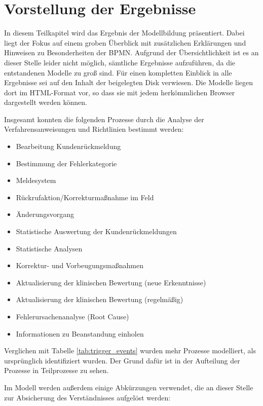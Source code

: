 \documentclass[a4paper,12pt]{report}
\begin{document}
\section{Vorstellung der Ergebnisse}\label{sec:ergebnisse_modellierung}
In diesem Teilkapitel wird das Ergebnis der Modellbildung präsentiert. Dabei liegt der Fokus auf einem groben Überblick mit zusätzlichen Erklärungen und Hinweisen zu Besonderheiten der BPMN. Aufgrund der Übersichtlichkeit ist es an dieser Stelle leider nicht möglich, sämtliche Ergebnisse aufzuführen, da die entstandenen Modelle zu groß sind. Für einen kompletten Einblick in alle Ergebnisse sei auf den Inhalt der beigelegten Disk verwiesen. Die Modelle liegen dort im HTML-Format vor, so dass sie mit jedem herkömmlichen Browser dargestellt werden können.

Insgesamt konnten die folgenden Prozesse durch die Analyse der Verfahrensanweisungen und Richtlinien bestimmt werden:

\begin{itemize}
\item Bearbeitung Kundenrückmeldung
\item Bestimmung der Fehlerkategorie
\item Meldesystem
\item Rückrufaktion/Korrekturmaßnahme im Feld
\item Änderungsvorgang
\item Statistische Auswertung der Kundenrückmeldungen
\item Statistische Analysen
\item Korrektur- und Vorbeugungsmaßnahmen
\item Aktualisierung der klinischen Bewertung (neue Erkenntnisse)
\item Aktualisierung der klinischen Bewertung (regelmäßig)
\item Fehlerursachenanalyse (Root Cause)
\item Informationen zu Beanstandung einholen
\end{itemize}

Verglichen mit Tabelle \ref{tab:trigger_events} wurden mehr Prozesse modelliert, als ursprünglich identifiziert wurden. Der Grund dafür ist in der Aufteilung der Prozesse in Teilprozesse zu sehen. 

Im Modell werden außerdem einige Abkürzungen verwendet, die an dieser Stelle zur Absicherung des Verständnisses aufgelöst werden:
\end{document}
